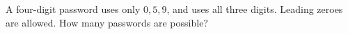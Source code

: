 A four-digit password uses only $0,5,9$, and uses all three digits. Leading zeroes are allowed. How many passwords are possible?
